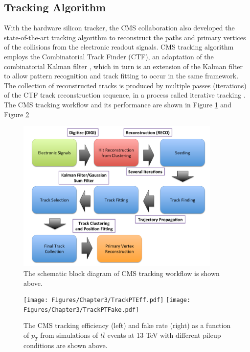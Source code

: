 \iffalse

\subsection{Tracking Algorithm}

With the hardware silicon tracker, the CMS collaboration also developed the state-of-the-art tracking algorithm to reconstruct the paths and primary vertices of the collisions from the electronic readout signals. CMS tracking algorithm employs the Combinatorial Track Finder (CTF), an adaptation of the combinatorial Kalman filter \cite{CMSTrack1,CMSTrack2,CMSTrack3}, which in turn is an extension of the Kalman filter \cite{Kalman} to allow pattern recognition and track fitting to occur in the same framework. The collection of reconstructed tracks is produced by multiple passes (iterations) of the CTF track reconstruction sequence, in a process called iterative tracking \cite{CMSTrackComp}. The CMS tracking workflow and its performance are shown in Figure \ref{TrackWorkFlow} and Figure \ref{CMSTrackPer}

\begin{figure}[hbtp]
\begin{center}
\includegraphics[width=0.90\textwidth]{Figures/Chapter3/TrackWF.pdf}
\caption{The schematic block diagram of CMS tracking workflow is shown above.}
\label{TrackWorkFlow}
\end{center}
\end{figure} 



\begin{figure}[hbtp]
\begin{center}
\texttt{[image: Figures/Chapter3/TrackPTEff.pdf]}
\texttt{[image: Figures/Chapter3/TrackPTFake.pdf]}
\caption{The CMS tracking efficiency (left) and fake rate (right) as a function of $p_T$ from simulations of $t \bar t$ events at 13 TeV with different pileup conditions are shown above.}
\label{CMSTrackPer}
\end{center}
\end{figure} 

